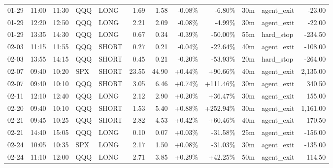 \documentclass[11pt,a4paper,twoside]{article}
\begin{document}
\begin{center}
\begin{longtable}{>{\color{txtmain}}l l l l l r r r r r >{\color{txtmain}}l r}
01-29 & 11:00 & 11:30 & QQQ & LONG & 1.69 & 1.58 & \textcolor{lossred}{-0.08\%} & \textcolor{lossred}{-6.80\%} & 30m & agent\_exit & \textcolor{lossred}{-23.00} \\
01-29 & 12:20 & 12:50 & QQQ & LONG & 2.21 & 2.09 & \textcolor{lossred}{-0.08\%} & \textcolor{lossred}{-4.99\%} & 30m & agent\_exit & \textcolor{lossred}{-22.00} \\
01-29 & 13:35 & 14:30 & QQQ & LONG & 0.67 & 0.34 & \textcolor{lossred}{-0.39\%} & \textcolor{lossred}{-50.00\%} & 55m & hard\_stop & \textcolor{lossred}{-234.50} \\
02-03 & 11:15 & 11:55 & QQQ & SHORT & 0.27 & 0.21 & \textcolor{lossred}{-0.04\%} & \textcolor{lossred}{-22.64\%} & 40m & agent\_exit & \textcolor{lossred}{-108.00} \\
02-03 & 13:55 & 14:15 & QQQ & SHORT & 0.45 & 0.21 & \textcolor{lossred}{-0.20\%} & \textcolor{lossred}{-53.93\%} & 20m & hard\_stop & \textcolor{lossred}{-264.00} \\
02-07 & 09:40 & 10:20 & SPX & SHORT & 23.55 & 44.90 & \textcolor{wingreen}{+0.44\%} & \textcolor{wingreen}{+90.66\%} & 40m & agent\_exit & \textcolor{wingreen}{2,135.00} \\
02-07 & 09:40 & 10:10 & QQQ & SHORT & 3.05 & 6.46 & \textcolor{wingreen}{+0.74\%} & \textcolor{wingreen}{+111.46\%} & 30m & agent\_exit & \textcolor{wingreen}{340.50} \\
02-11 & 12:10 & 12:40 & QQQ & LONG & 2.12 & 2.90 & \textcolor{wingreen}{+0.20\%} & \textcolor{wingreen}{+36.47\%} & 30m & agent\_exit & \textcolor{wingreen}{155.00} \\
02-20 & 09:40 & 10:10 & QQQ & SHORT & 1.53 & 5.40 & \textcolor{wingreen}{+0.88\%} & \textcolor{wingreen}{+252.94\%} & 30m & agent\_exit & \textcolor{wingreen}{1,161.00} \\
02-21 & 09:45 & 10:25 & QQQ & SHORT & 2.82 & 4.53 & \textcolor{wingreen}{+0.42\%} & \textcolor{wingreen}{+60.46\%} & 40m & agent\_exit & \textcolor{wingreen}{170.50} \\
02-21 & 14:40 & 15:05 & QQQ & LONG & 0.10 & 0.07 & \textcolor{wingreen}{+0.03\%} & \textcolor{lossred}{-31.58\%} & 25m & agent\_exit & \textcolor{lossred}{-156.00} \\
02-24 & 10:05 & 10:35 & SPX & LONG & 2.17 & 1.50 & \textcolor{wingreen}{+0.08\%} & \textcolor{lossred}{-31.03\%} & 30m & agent\_exit & \textcolor{lossred}{-135.00} \\
02-24 & 11:10 & 12:00 & QQQ & LONG & 2.71 & 3.85 & \textcolor{wingreen}{+0.29\%} & \textcolor{wingreen}{+42.25\%} & 50m & agent\_exit & \textcolor{wingreen}{114.50} \\

\end{longtable}
\end{center}
\end{document}
